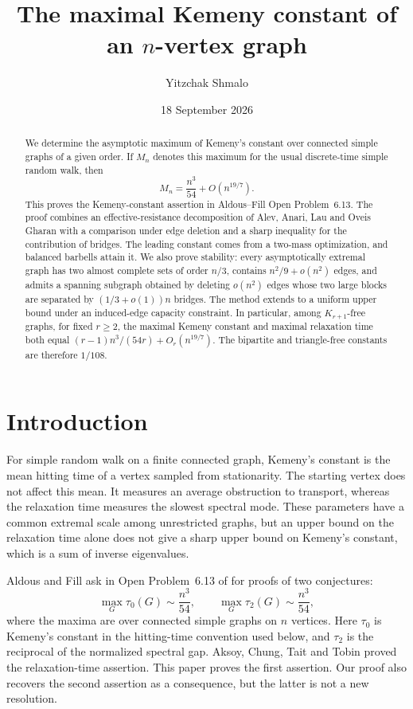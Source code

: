 \documentclass[11pt]{amsart}
\title[The maximal Kemeny constant]{The maximal Kemeny constant of an $n$-vertex graph}
\author{Yitzchak Shmalo}
\date{18 September 2026}
\numberwithin{equation}{section}
\theoremstyle{definition}
\theoremstyle{remark}
\begin{document}
\begin{abstract}
We determine the asymptotic maximum of Kemeny's constant over connected simple graphs of a given order. If $M_n$ denotes this maximum for the usual discrete-time simple random walk, then
\[
M_n=\frac{n^3}{54}+O(n^{19/7}).
\]
This proves the Kemeny-constant assertion in Aldous--Fill Open Problem~6.13. The proof combines an effective-resistance decomposition of Alev, Anari, Lau and Oveis Gharan with a comparison under edge deletion and a sharp inequality for the contribution of bridges. The leading constant comes from a two-mass optimization, and balanced barbells attain it. We also prove stability: every asymptotically extremal graph has two almost complete sets of order $n/3$, contains $n^2/9+o(n^2)$ edges, and admits a spanning subgraph obtained by deleting $o(n^2)$ edges whose two large blocks are separated by $(1/3+o(1))n$ bridges. The method extends to a uniform upper bound under an induced-edge capacity constraint. In particular, among $K_{r+1}$-free graphs, for fixed $r\ge2$, the maximal Kemeny constant and maximal relaxation time both equal $(r-1)n^3/(54r)+O_r(n^{19/7})$. The bipartite and triangle-free constants are therefore $1/108$.
\end{abstract}
\maketitle

\section{Introduction}
For simple random walk on a finite connected graph, Kemeny's constant is the mean hitting time of a vertex sampled from stationarity. The starting vertex does not affect this mean. It measures an average obstruction to transport, whereas the relaxation time measures the slowest spectral mode. These parameters have a common extremal scale among unrestricted graphs, but an upper bound on the relaxation time alone does not give a sharp upper bound on Kemeny's constant, which is a sum of inverse eigenvalues.

Aldous and Fill ask in Open Problem~6.13 of \cite[Chapter~6, Section~6.3.2]{AF} for proofs of two conjectures:
\begin{equation}\label{eq:AF}
\max_G\tau_0(G)\sim\frac{n^3}{54},\qquad
\max_G\tau_2(G)\sim\frac{n^3}{54},
\end{equation}
where the maxima are over connected simple graphs on $n$ vertices. Here $\tau_0$ is Kemeny's constant in the hitting-time convention used below, and $\tau_2$ is the reciprocal of the normalized spectral gap. Aksoy, Chung, Tait and Tobin \cite{ACTT} proved the relaxation-time assertion. This paper proves the first assertion. Our proof also recovers the second assertion as a consequence, but the latter is not a new resolution.
\end{document}
